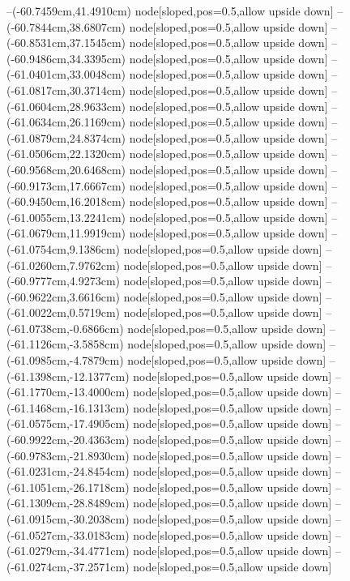 --(-60.7459cm,41.4910cm) node[sloped,pos=0.5,allow upside down]{\ArrowIn}
--(-60.7844cm,38.6807cm) node[sloped,pos=0.5,allow upside down]{\ArrowIn}
--(-60.8531cm,37.1545cm) node[sloped,pos=0.5,allow upside down]{\ArrowIn}
--(-60.9486cm,34.3395cm) node[sloped,pos=0.5,allow upside down]{\ArrowIn}
--(-61.0401cm,33.0048cm) node[sloped,pos=0.5,allow upside down]{\ArrowIn}
--(-61.0817cm,30.3714cm) node[sloped,pos=0.5,allow upside down]{\ArrowIn}
--(-61.0604cm,28.9633cm) node[sloped,pos=0.5,allow upside down]{\ArrowIn}
--(-61.0634cm,26.1169cm) node[sloped,pos=0.5,allow upside down]{\ArrowIn}
--(-61.0879cm,24.8374cm) node[sloped,pos=0.5,allow upside down]{\ArrowIn}
--(-61.0506cm,22.1320cm) node[sloped,pos=0.5,allow upside down]{\ArrowIn}
--(-60.9568cm,20.6468cm) node[sloped,pos=0.5,allow upside down]{\ArrowIn}
--(-60.9173cm,17.6667cm) node[sloped,pos=0.5,allow upside down]{\ArrowIn}
--(-60.9450cm,16.2018cm) node[sloped,pos=0.5,allow upside down]{\ArrowIn}
--(-61.0055cm,13.2241cm) node[sloped,pos=0.5,allow upside down]{\ArrowIn}
--(-61.0679cm,11.9919cm) node[sloped,pos=0.5,allow upside down]{\ArrowIn}
--(-61.0754cm,9.1386cm) node[sloped,pos=0.5,allow upside down]{\ArrowIn}
--(-61.0260cm,7.9762cm) node[sloped,pos=0.5,allow upside down]{\ArrowIn}
--(-60.9777cm,4.9273cm) node[sloped,pos=0.5,allow upside down]{\ArrowIn}
--(-60.9622cm,3.6616cm) node[sloped,pos=0.5,allow upside down]{\ArrowIn}
--(-61.0022cm,0.5719cm) node[sloped,pos=0.5,allow upside down]{\ArrowIn}
--(-61.0738cm,-0.6866cm) node[sloped,pos=0.5,allow upside down]{\ArrowIn}
--(-61.1126cm,-3.5858cm) node[sloped,pos=0.5,allow upside down]{\ArrowIn}
--(-61.0985cm,-4.7879cm) node[sloped,pos=0.5,allow upside down]{\ArrowIn}
--(-61.1398cm,-12.1377cm) node[sloped,pos=0.5,allow upside down]{\ArrowIn}
--(-61.1770cm,-13.4000cm) node[sloped,pos=0.5,allow upside down]{\ArrowIn}
--(-61.1468cm,-16.1313cm) node[sloped,pos=0.5,allow upside down]{\ArrowIn}
--(-61.0575cm,-17.4905cm) node[sloped,pos=0.5,allow upside down]{\ArrowIn}
--(-60.9922cm,-20.4363cm) node[sloped,pos=0.5,allow upside down]{\ArrowIn}
--(-60.9783cm,-21.8930cm) node[sloped,pos=0.5,allow upside down]{\ArrowIn}
--(-61.0231cm,-24.8454cm) node[sloped,pos=0.5,allow upside down]{\ArrowIn}
--(-61.1051cm,-26.1718cm) node[sloped,pos=0.5,allow upside down]{\ArrowIn}
--(-61.1309cm,-28.8489cm) node[sloped,pos=0.5,allow upside down]{\ArrowIn}
--(-61.0915cm,-30.2038cm) node[sloped,pos=0.5,allow upside down]{\ArrowIn}
--(-61.0527cm,-33.0183cm) node[sloped,pos=0.5,allow upside down]{\ArrowIn}
--(-61.0279cm,-34.4771cm) node[sloped,pos=0.5,allow upside down]{\ArrowIn}
--(-61.0274cm,-37.2571cm) node[sloped,pos=0.5,allow upside down]{\ArrowIn}
